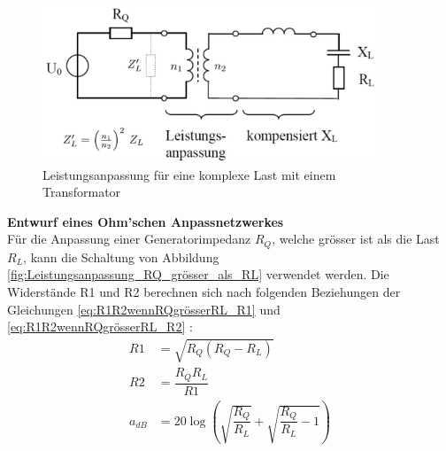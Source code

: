 \begin{figure}[!ht]
	\centering
	\includegraphics[width=10cm]{content/bilder/AnpassungKomplexerLast.pdf}%
	\caption{Leistungsanpassung für eine komplexe Last mit einem Transformator\cite{Tekom}}
	\label{AnpassungKomplexerLast}
\end{figure}
\newpage
\textbf{Entwurf eines Ohm’schen Anpassnetzwerkes} \\
Für die Anpassung einer Generatorimpedanz $R_Q$, welche grösser ist als die Last $R_L$, kann die Schaltung von Abbildung \ref{fig:Leistungsanpassung_RQ_grösser_als_RL} verwendet werden. Die Widerstände R1 und R2 berechnen sich nach folgenden Beziehungen der Gleichungen \ref{eq:R1R2wennRQgrösserRL_R1} und \ref{eq:R1R2wennRQgrösserRL_R2} \cite{Tekom}:
	\begin{align}
		R1 &= \sqrt{R_Q(R_Q-R_L)} \label{eq:R1R2wennRQgrösserRL_R1} \\
		R2 &= \dfrac{R_Q R_L}{R1} \label{eq:R1R2wennRQgrösserRL_R2} \\
		a_{dB} &= 20\log \left( \sqrt{\dfrac{R_Q}{R_L}}+\sqrt{\dfrac{R_Q}{R_L}-1}\right)
	\end{align}

